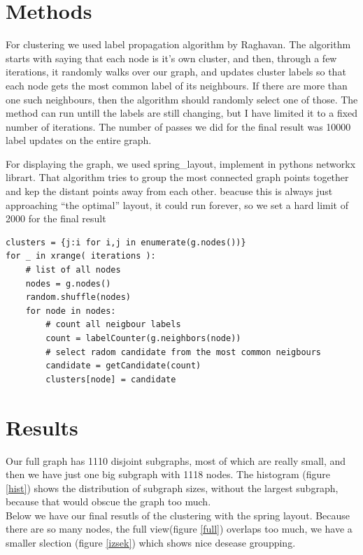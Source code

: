 \documentclass[a4paper,11pt]{article}
\begin{document}
\section{Methods}

For clustering we used label propagation algorithm by Raghavan. The algorithm starts with saying that each node is it's own cluster, and then, through a few iterations, it randomly walks over our graph, and updates cluster labels so that each node gets the most common label of its neighbours. If there are more than one such neighbours, then the algorithm should randomly select one of those. The method can run untill the labels are still changing, but I have limited it to a fixed number of iterations. The number of passes we did for the final result was 10000 label updates on the entire graph.

For displaying the graph, we used spring\_layout, implement in pythons networkx librart. That algorithm tries to group the most connected graph points together and kep the distant points away from each other. beacuse this is always just approaching ``the optimal'' layout, it could run forever, so we set a hard limit of 2000 for the final result


\begin{lstlisting}
clusters = {j:i for i,j in enumerate(g.nodes())}
for _ in xrange( iterations ):
    # list of all nodes
    nodes = g.nodes()
    random.shuffle(nodes)
    for node in nodes:
        # count all neigbour labels
        count = labelCounter(g.neighbors(node))
        # select radom candidate from the most common neigbours
        candidate = getCandidate(count)
        clusters[node] = candidate
\end{lstlisting}

\section{Results}

Our full graph has 1110 disjoint subgraphs, most of which are really small, and then we have just one big subgraph with 1118 nodes. The histogram (figure \ref{hist}) shows the distribution of subgraph sizes, without the largest subgraph, because that would obscue the graph too much. \\

Below we have our final resutls of the clustering with the spring layout. Because there are so many nodes, the full view(figure \ref{full}) overlaps too much, we have a smaller slection (figure \ref{izsek}) which shows nice desease groupping.\\
\end{document}

